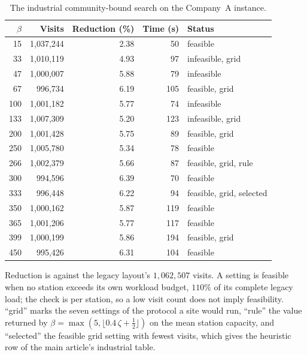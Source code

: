 \documentclass[11pt]{article}
\newcommand{\tbl}[1]{\caption{#1}}
\newcommand{\tabnote}[1]{\vspace{2pt}\footnotesize\raggedright #1\par}
\begin{document}
\begin{table}[H]
\centering
\tbl{The industrial community-bound search on the Company~A instance.}
{\small\begin{tabular*}{\textwidth}{@{\extracolsep{\fill}}rrrrl@{}}
\toprule
$\beta$ & Visits & Reduction (\%) & Time (s) & Status \\
\midrule
15  & 1{,}037{,}244 & 2.38 & 50  & feasible \\
33  & 1{,}010{,}119 & 4.93 & 97  & infeasible, grid \\
47  & 1{,}000{,}007 & 5.88 & 79  & infeasible \\
67  & 996{,}734     & 6.19 & 105 & feasible, grid \\
100 & 1{,}001{,}182 & 5.77 & 74  & infeasible \\
133 & 1{,}007{,}309 & 5.20 & 123 & infeasible, grid \\
200 & 1{,}001{,}428 & 5.75 & 89  & feasible, grid \\
250 & 1{,}005{,}780 & 5.34 & 78  & feasible \\
266 & 1{,}002{,}379 & 5.66 & 87  & feasible, grid, rule \\
300 & 994{,}596     & 6.39 & 70  & feasible \\
333 & 996{,}448     & 6.22 & 94  & feasible, grid, selected \\
350 & 1{,}000{,}162 & 5.87 & 119 & feasible \\
365 & 1{,}001{,}206 & 5.77 & 117 & feasible \\
399 & 1{,}000{,}199 & 5.86 & 194 & feasible, grid \\
450 & 995{,}426     & 6.31 & 104 & feasible \\
\bottomrule
\end{tabular*}}
\tabnote{Reduction is against the legacy layout's $1{,}062{,}507$ visits. A setting is feasible when no station exceeds its own workload budget, $110\%$ of its complete legacy load; the check is per station, so a low visit count does not imply feasibility. ``grid'' marks the seven settings of the protocol a site would run, ``rule'' the value returned by $\beta=\max(5,\lfloor 0.4\,\zeta+\tfrac12\rfloor)$ on the mean station capacity, and ``selected'' the feasible grid setting with fewest visits, which gives the heuristic row of the main article's industrial table.}
\label{tab:betasearch}
\end{table}
\end{document}
